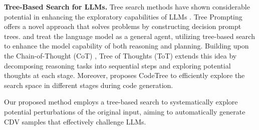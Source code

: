 
\textbf{Tree-Based Search for LLMs.}
Tree search methods have shown considerable potential in enhancing the exploratory capabilities of LLMs \citep{zhang2023planning,hu2024uncertainty}. Tree Prompting \citep{singh2023tree} offers a novel approach that solves problems by constructing decision prompt trees. \citet{zhou2023language} and \citet{koh2024tree} treat the language model as a general agent, utilizing tree-based search to enhance the model capability of both reasoning and planning. Building upon the Chain-of-Thought (CoT) \citep{wei2022chain}, Tree of Thoughts (ToT) \citep{yao2024tree} extends this idea by decomposing reasoning tasks into sequential steps and exploring potential thoughts at each stage. Moreover, \citet{li2024codetree} proposes CodeTree to efficiently explore the search space in different stages during code generation.



Our proposed method employs a tree-based search to systematically explore potential perturbations of the original input, aiming to automatically generate CDV samples that effectively challenge LLMs.






